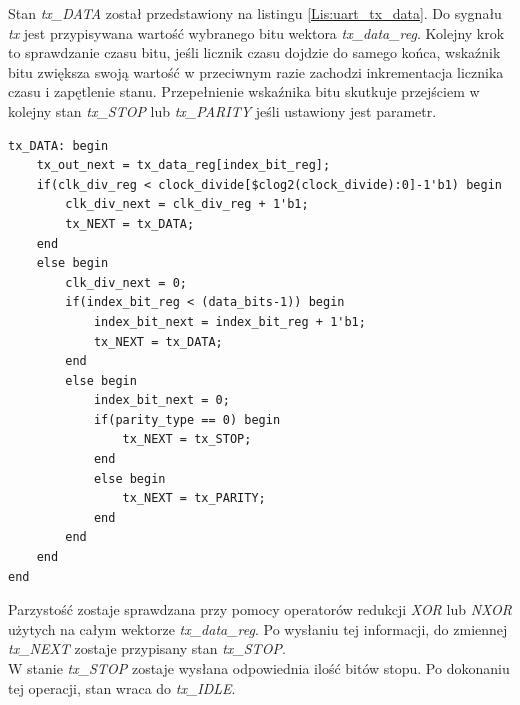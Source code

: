 \documentclass[11pt,a4paper]{article}
\begin{document}
Stan \textit{tx\_DATA} został przedstawiony na listingu \ref{Lis:uart_tx_data}. Do sygnału \textit{tx} jest przypisywana wartość wybranego bitu wektora \textit{tx\_data\_reg}. Kolejny krok to sprawdzanie czasu bitu, jeśli licznik czasu dojdzie do samego końca, wskaźnik bitu zwiększa swoją wartość w przeciwnym razie zachodzi inkrementacja licznika czasu i zapętlenie stanu. Przepełnienie wskaźnika bitu skutkuje przejściem w kolejny stan \textit{tx\_STOP} lub \textit{tx\_PARITY} jeśli ustawiony jest parametr.\\
\begin{minipage}{\textwidth}
\begin{scriptsize}
\begin{lstlisting}[label=Lis:uart_tx_data,caption=Stan \textit{tx\_DATA}]
tx_DATA: begin
	tx_out_next = tx_data_reg[index_bit_reg];
	if(clk_div_reg < clock_divide[$clog2(clock_divide):0]-1'b1) begin
		clk_div_next = clk_div_reg + 1'b1;
		tx_NEXT = tx_DATA;
	end
	else begin
		clk_div_next = 0;
		if(index_bit_reg < (data_bits-1)) begin
			index_bit_next = index_bit_reg + 1'b1;
			tx_NEXT = tx_DATA;
		end
		else begin
			index_bit_next = 0;
			if(parity_type == 0) begin
				tx_NEXT = tx_STOP;
			end
			else begin
				tx_NEXT = tx_PARITY;
			end
		end
	end
end
\end{lstlisting}
\end{scriptsize}
\end{minipage}
Parzystość zostaje sprawdzana przy pomocy operatorów redukcji \textit{XOR} lub \textit{NXOR} użytych na całym wektorze \textit{tx\_data\_reg}. Po wysłaniu tej informacji, do zmiennej \textit{tx\_NEXT} zostaje przypisany stan \textit{tx\_STOP}.\\
W stanie \textit{tx\_STOP} zostaje wysłana odpowiednia ilość bitów stopu. Po dokonaniu tej operacji, stan wraca do \textit{tx\_IDLE}.
\end{document}

